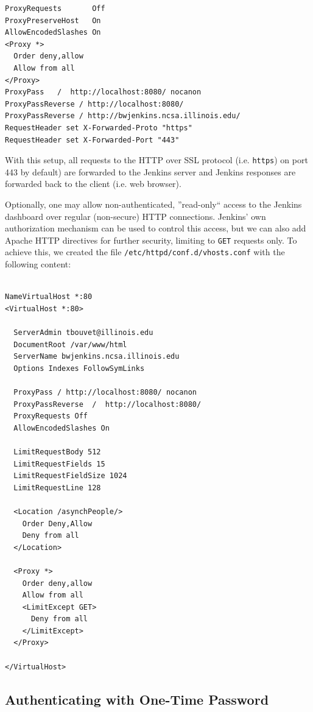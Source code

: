 \documentclass[10pt, conference, compsocconf]{IEEEtran}
\begin{document}
\begin{lstlisting}[frame=b,captionpos=b,label=lst:reverseProxy,caption=Relevant configuration lines for setting up reverse proxy in Apache HTTP Server]
ProxyRequests       Off
ProxyPreserveHost   On 
AllowEncodedSlashes On 
<Proxy *>
  Order deny,allow
  Allow from all  
</Proxy>
ProxyPass   /  http://localhost:8080/ nocanon
ProxyPassReverse / http://localhost:8080/
ProxyPassReverse / http://bwjenkins.ncsa.illinois.edu/
RequestHeader set X-Forwarded-Proto "https"
RequestHeader set X-Forwarded-Port "443"    
\end{lstlisting}

With this setup, all requests to the HTTP over SSL protocol (i.e. \texttt{https}) on port 443 by default) are forwarded to the Jenkins server and Jenkins responses are forwarded back to the client (i.e. web browser).

Optionally, one may allow non-authenticated, ''read-only`` access to the Jenkins dashboard over regular (non-secure) HTTP connections. 
Jenkins' own authorization mechanism can be used to control this access, but we can also add Apache HTTP directives for further security, limiting to \texttt{GET} requests only. 
To achieve this, we created the file \texttt{/etc/httpd/conf.d/vhosts.conf} with the following content:
\begin{lstlisting}
 
NameVirtualHost *:80
<VirtualHost *:80>

  ServerAdmin tbouvet@illinois.edu
  DocumentRoot /var/www/html
  ServerName bwjenkins.ncsa.illinois.edu
  Options Indexes FollowSymLinks

  ProxyPass / http://localhost:8080/ nocanon
  ProxyPassReverse  /  http://localhost:8080/
  ProxyRequests Off
  AllowEncodedSlashes On

  LimitRequestBody 512
  LimitRequestFields 15
  LimitRequestFieldSize 1024
  LimitRequestLine 128

  <Location /asynchPeople/>
    Order Deny,Allow
    Deny from all
  </Location>

  <Proxy *>
    Order deny,allow
    Allow from all
    <LimitExcept GET>
      Deny from all
    </LimitExcept>
  </Proxy>

</VirtualHost>

\end{lstlisting}

\subsection{Authenticating with One-Time Password}
\end{document}
